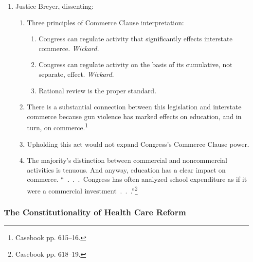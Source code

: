 \begin{enumerate}
\begin{enumerate}
        determinative.\footnote{Casebook pp. 613--14.}
    \end{enumerate}
    \item Justice Breyer, dissenting:
    \begin{enumerate}
        \item Three principles of Commerce Clause interpretation:
        \begin{enumerate}
            \item Congress can regulate activity that significantly effects 
            interstate commerce. \emph{Wickard.}
            \item Congress can regulate activity on the basis of its 
            cumulative, not separate, effect. \emph{Wickard.}
            \item Rational review is the proper standard.
        \end{enumerate}
        \item There is a substantial connection between this legislation and 
        interstate commerce because gun violence has marked effects on 
        education, and in turn, on commerce.\footnote{Casebook pp. 615--16.}
        \item Upholding this act would not expand Congress's Commerce Clause 
        power.
        \item The majority's distinction between commercial and noncommercial 
        activities is tenuous. And anyway, education has a clear impact on 
        commerce. ``~.~.~.~Congress has often analyzed school expenditure as 
        if it were a commercial investment~.~.~.''\footnote{Casebook pp. 
        618--19.}
    \end{enumerate}
\end{enumerate}
 
\subsubsection{The Constitutionality of Health Care Reform}


